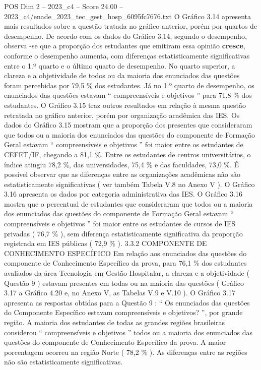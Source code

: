 \begin{textsample}{POS Dim 2 – 2023\_c4 – Score 24.00 – 2023\_c4/enade\_2023\_tec\_gest\_hosp\_6095fc7676.txt}
O Gráfico 3.14 apresenta mais resultados sobre a questão tratada no gráfico anterior, porém por quartos de desempenho.
De acordo com os dados do Gráfico 3.14, segundo o desempenho, observa -se que a proporção dos estudantes que emitiram essa opinião \textbf{cresce}, conforme o desempenho aumenta, com diferenças estatisticamente significativas entre o 1.º quarto e o último quarto de desempenho.
No quarto superior, a clareza e a objetividade de todos ou da maioria dos enunciados das questões foram percebidas por 79,5 \% dos estudantes.
Já no 1.º quarto de desempenho, os enunciados das questões estavam “ compreensíveis e objetivos ” para 71,8 \% dos estudantes.
O Gráfico 3.15 traz outros resultados em relação à mesma questão retratada no gráfico anterior, porém por organização acadêmica das IES.
Os dados do Gráfico 3.15 mostram que a proporção dos presentes que consideraram que todos ou a maioria dos enunciados das questões do componente de Formação Geral estavam “ compreensíveis e objetivos ” foi maior entre os estudantes de CEFET/IF, chegando a 81,1 \%.
Entre os estudantes de centros universitários, o índice atingiu 78,2 \%, das universidades, 75,4 \% e das faculdades, 73,0 \%.
É possível observar que as diferenças entre as organizações acadêmicas não são estatisticamente significativas ( ver também Tabela V.8 no Anexo V ).
O Gráfico 3.16 apresenta os dados por categoria administrativa das IES.
O Gráfico 3.16 mostra que o percentual de estudantes que consideraram que todos ou a maioria dos enunciados das questões do componente de Formação Geral estavam “ compreensíveis e objetivos ” foi maior entre os estudantes de cursos de IES privadas ( 76,7 \% ), sem diferença estatisticamente significativa da proporção registrada em IES públicas ( 72,9 \% ). 3.3.2 COMPONENTE DE CONHECIMENTO ESPECÍFICO Em relação aos enunciados das questões do componente de Conhecimento Específico da prova, para 76,1 \% dos estudantes avaliados da área Tecnologia em Gestão Hospitalar, a clareza e a objetividade ( Questão 9 ) estavam presentes em todas ou na maioria das questões ( Gráfico 3.17 a Gráfico 4.20 e, no Anexo V, as Tabelas V.9 e V.10 ).
O Gráfico 3.17 apresenta as respostas obtidas para a Questão 9 : “ Os enunciados das questões do Componente Específico estavam compreensíveis e objetivos? ”, por grande região.
A maioria dos estudantes de todas as grandes regiões brasileiras considerou “ compreensíveis e objetivos ” todos ou a maioria dos enunciados das questões do componente de Conhecimento Específico da prova.
A maior porcentagem ocorreu na região Norte ( 78,2 \% ).
As diferenças entre as regiões não são estatisticamente significativas.

\end{textsample}
